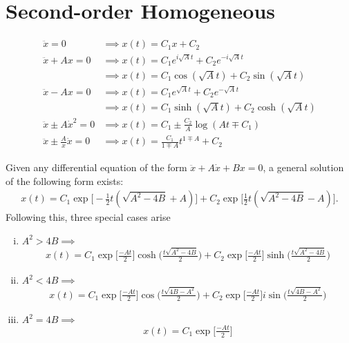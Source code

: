 \newpage
\section{Second-order Homogeneous}
\begin{align}
	\ddot{x}=0 &\implies x(t)=C_1x+C_2 \\
	\ddot{x}+Ax=0 &\implies x(t)=C_1e^{i\sqrt{A}t}+C_2e^{-i\sqrt{A}t} \\ &\implies x(t)=C_1\cos(\sqrt{A}t)+C_2\sin(\sqrt{A}t) \\
	\ddot{x}-Ax=0 &\implies x(t)=C_1e^{\sqrt{A}t}+C_2e^{-\sqrt{A}t} \\
	&\implies x(t)=C_1\sinh(\sqrt{A}t)+C_2\cosh(\sqrt{A}t) \\
	\ddot{x}\pm A \dot{x}^2=0 &\implies x(t) = C_1\pm\frac{C_2}{A}\log(At\mp C_1) \\
	\ddot{x}\pm \frac{A}{x} \dot{x}=0 &\implies x(t) = \frac{C_1}{1\mp A}t^{1\mp A}+C_2
\end{align} 



\begin{fancybox}[$\ddot{x}+A\dot{x}+Bx =0$]{}
Given any differential equation of the form $\ddot{x}+A\dot{x}+Bx =0$, a general solution of the following form exists:
\begin{align}
x(t)=C_1\exp\bigg[-\frac{1}{2}t(\sqrt{A^2-4B}+A)\bigg] +C_2\exp\bigg[\frac{1}{2}t(\sqrt{A^2-4B}-A)\bigg].
\end{align}
Following this, three special cases arise
\begin{enumerate}[(i)]
	\item $A^2>4B \implies$
	\begin{align}
	x(t)=C_1\exp\bigg[\frac{-At}{2}\bigg]\cosh\bigg(\frac{t\sqrt{A^2-4B}}{2} \bigg) +C_2\exp\bigg[\frac{-At}{2}\bigg]\sinh\bigg(\frac{t\sqrt{A^2-4B}}{2} \bigg)
	\end{align}
	\item $A^2<4B \implies$
	\begin{align}
	x(t)=C_1\exp\bigg[\frac{-At}{2}\bigg]\cos\bigg(\frac{t\sqrt{4B-A^2}}{2} \bigg) +C_2\exp\bigg[\frac{-At}{2}\bigg]i\sin\bigg(\frac{t\sqrt{4B-A^2}}{2} \bigg)	
	\end{align}
	\item $A^2=4B \implies $
	\begin{align}
	x(t)=C_1\exp\bigg[\frac{-At}{2}\bigg]
	\end{align}
\end{enumerate}
\end{fancybox}













